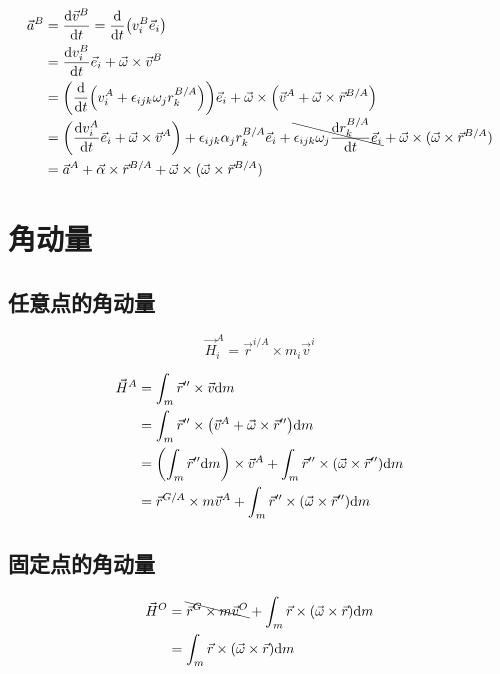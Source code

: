 \begin{equation}
  \begin{split}
    \vec{a}^B&=\frac{\mathrm{d}\vec{v}^B}{\mathrm{d}t}=\frac{\mathrm{d}}{\mathrm{d}t}\qty(v^B_i\vec{e}_i)\\
    &=\frac{\mathrm{d}v^B_i}{\mathrm{d}t}\vec{e}_i+\vec{\omega}\times\vec{v}^B\\
    &=\qty(\frac{\mathrm{d}}{\mathrm{d}t}\qty(v^A_i+\epsilon_{ijk}\omega_jr^{B/A}_k))\vec{e}_i+\vec{\omega}\times\qty(\vec{v}^A+\vec{\omega}\times\vec{r}^{B/A})\\
    &=\qty(\frac{\mathrm{d}v^A_i}{\mathrm{d}t}\vec{e}_i+\vec{\omega}\times\vec{v}^A)+\epsilon_{ijk}\alpha_jr^{B/A}_k\vec{e}_i+\bcancel{\epsilon_{ijk}\omega_j\frac{\mathrm{d}r^{B/A}_k}{\mathrm{d}t}\vec{e}_i}+\vec{\omega}\times(\vec{\omega}\times\vec{r}^{B/A})\\
    &=\vec{a}^A+\vec{\alpha}\times\vec{r}^{B/A}+\vec{\omega}\times(\vec{\omega}\times\vec{r}^{B/A})
  \end{split}
\end{equation}
\section{角动量}
\subsection{任意点的角动量}
\begin{equation}
  \vec{H}^A_i=\vec{r}^{i/A}\times m_i\vec{v}^i
\end{equation}

\begin{equation}
  \begin{split}
    \vec{H}^A&=\int_m\vec{r}''\times\vec{v}\mathrm{d}m\\
    &=\int_m\vec{r}''\times\qty(\vec{v}^A+\vec{\omega}\times\vec{r}'')\mathrm{d}m\\
    &=\qty(\int_m\vec{r}''\mathrm{d}m)\times\vec{v}^A+\int_m\vec{r}''\times(\vec{\omega}\times\vec{r}'')\mathrm{d}m\\
    &=\vec{r}^{G/A}\times m\vec{v}^A+\int_m\vec{r}''\times(\vec{\omega}\times\vec{r}'')\mathrm{d}m
  \end{split}
\end{equation}

\subsection{固定点的角动量}
\begin{equation}
  \begin{split}
    \vec{H}^O&=\bcancel{\vec{r}^{G}\times m\vec{v}^O}+\int_m\vec{r}\times(\vec{\omega}\times\vec{r})\mathrm{d}m\\
    &=\int_m\vec{r}\times(\vec{\omega}\times\vec{r})\mathrm{d}m
  \end{split}
\end{equation}
